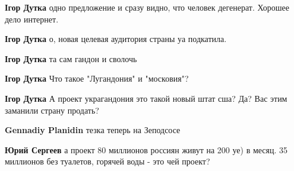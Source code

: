 \begin{itemize}
\begin{itemize}
\textbf{Ігор Дутка} одно предложение и сразу видно, что человек дегенерат. Хорошее дело интернет.

 
\textbf{Ігор Дутка} о, новая целевая аудитория страны уа подкатила.

 
\textbf{Ігор Дутка} та сам гандон и сволочь

 
\textbf{Ігор Дутка} Что такое "Лугандония" и "московия"?

 
\textbf{Ігор Дутка} А проект украгандония это такой новый штат сша? Да? Вас этим заманили страну продать?

 
\textbf{Gennadiy Planidin} тезка теперь на Зеподсосе

 
\textbf{Юрий Сергеев} а проект 80 миллионов россиян живут на 200 уе) в месяц. 35 миллионов без туалетов, горячей воды - это чей проект?

 

\end{itemize}
\end{itemize}
